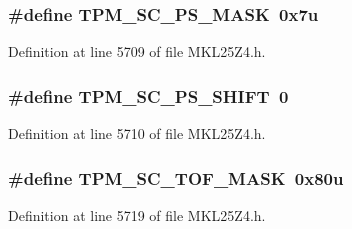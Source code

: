 \subsubsection[{\texorpdfstring{T\+P\+M\+\_\+\+S\+C\+\_\+\+P\+S\+\_\+\+M\+A\+SK}{TPM_SC_PS_MASK}}]{\setlength{\rightskip}{0pt plus 5cm}\#define T\+P\+M\+\_\+\+S\+C\+\_\+\+P\+S\+\_\+\+M\+A\+SK~0x7u}\hypertarget{group___t_p_m___register___masks_gab20218cf8b49b4d2aa932cfafdf5a43e}{}\label{group___t_p_m___register___masks_gab20218cf8b49b4d2aa932cfafdf5a43e}


Definition at line 5709 of file M\+K\+L25\+Z4.\+h.

\subsubsection[{\texorpdfstring{T\+P\+M\+\_\+\+S\+C\+\_\+\+P\+S\+\_\+\+S\+H\+I\+FT}{TPM_SC_PS_SHIFT}}]{\setlength{\rightskip}{0pt plus 5cm}\#define T\+P\+M\+\_\+\+S\+C\+\_\+\+P\+S\+\_\+\+S\+H\+I\+FT~0}\hypertarget{group___t_p_m___register___masks_ga13fca37c98cc93640be8ed1733cb9805}{}\label{group___t_p_m___register___masks_ga13fca37c98cc93640be8ed1733cb9805}


Definition at line 5710 of file M\+K\+L25\+Z4.\+h.

\subsubsection[{\texorpdfstring{T\+P\+M\+\_\+\+S\+C\+\_\+\+T\+O\+F\+\_\+\+M\+A\+SK}{TPM_SC_TOF_MASK}}]{\setlength{\rightskip}{0pt plus 5cm}\#define T\+P\+M\+\_\+\+S\+C\+\_\+\+T\+O\+F\+\_\+\+M\+A\+SK~0x80u}\hypertarget{group___t_p_m___register___masks_gae25305cad922790ffe882f8d4d423439}{}\label{group___t_p_m___register___masks_gae25305cad922790ffe882f8d4d423439}


Definition at line 5719 of file M\+K\+L25\+Z4.\+h.



